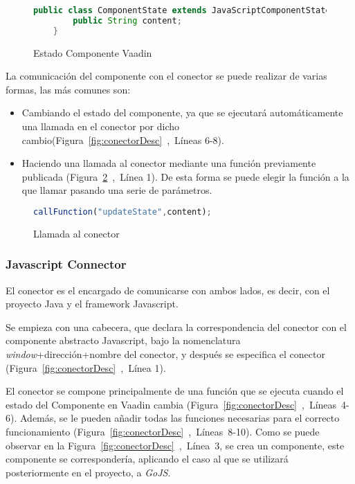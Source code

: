 \begin{figure}[!tb]
	\centering
	\begin{lstlisting}[language=Java]
	public class ComponentState	extends JavaScriptComponentState {
		public String content;
	}\end{lstlisting}
	\caption{Estado Componente Vaadin}
	\label{fig:estadoComponenteVaadin}
\end{figure}


La comunicación del componente con el conector se puede realizar de varias formas, las más comunes son:
\begin{itemize}
	\item  Cambiando el estado del componente, ya que se ejecutará automáticamente una llamada en el conector por dicho cambio(Figura~\ref{fig:conectorDesc}~,~Líneas 6-8).
	\item  Haciendo una llamada al conector mediante una función previamente publicada (Figura~\ref{fig:callfunction}~,~Línea 1). De esta forma se puede elegir la función a la que llamar pasando una serie de parámetros.
\end{itemize}

\begin{figure}[!tb]
	\centering
	\begin{lstlisting}[language=JavaScript]
	callFunction("updateState",content);\end{lstlisting}
	\caption{Llamada al conector}
	\label{fig:callfunction}
\end{figure}



\subsubsection{Javascript Connector}	


El conector es el encargado de comunicarse con ambos lados, es decir, con el proyecto Java y el framework Javascript.

Se empieza con una cabecera, que declara la correspondencia del conector con el componente abstracto Javascript, bajo la nomenclatura \emph{window}+dirección+nombre del conector, y después se especifica el conector (Figura~\ref{fig:conectorDesc}~,~Línea 1).

El conector se compone principalmente de una función que se ejecuta cuando el estado del Componente en Vaadin cambia (Figura~\ref{fig:conectorDesc}~,~Líneas~4-6). Además, se le pueden añadir todas las funciones necesarias para el correcto funcionamiento (Figura~\ref{fig:conectorDesc}~,~Líneas~8-10). Como se puede observar en la Figura~\ref{fig:conectorDesc}~,~Línea~3, se crea un componente, este componente se correspondería, aplicando el caso al que se utilizará posteriormente en el proyecto, a \emph{GoJS}.



